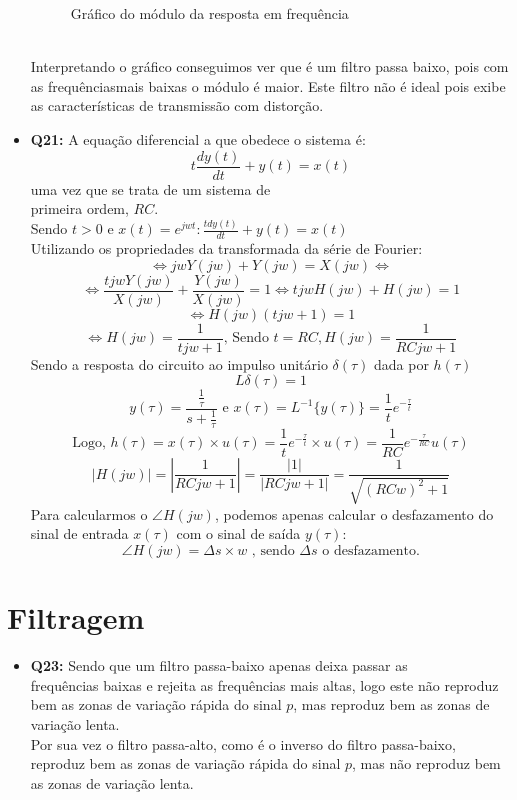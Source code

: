 \documentclass[a4paper, 12pt]{article}
\begin{document}
\begin{itemize}
\begin{figure}[!ht]
              \vspace{-10px}
              \caption{Gráfico do módulo da resposta em frequência}
          \end{figure}
          \\Interpretando o gráfico conseguimos ver que é um filtro passa baixo, pois com as frequênciasmais baixas o módulo é maior. Este filtro não é ideal pois exibe as características de transmissão com distorção.
    \item \textbf{Q21:} A equação diferencial a que obedece o sistema é:
          \[t\frac{dy(t)}{dt} + y(t) = x(t)\]
          uma vez que se trata de um sistema de\\
          primeira ordem, $RC$.\\
          Sendo $t>0$ e $x(t) = e^{jwt}: \frac{tdy(t)}{dt} + y(t) = x(t)$\\
          Utilizando os propriedades da transformada da série de Fourier:
          \[\Leftrightarrow jwY(jw) + Y(jw) = X(jw)\Leftrightarrow\]
          \[\Leftrightarrow \frac{tjwY(jw)}{X(jw)} + \frac{Y(jw)}{X(jw)} = 1 \Leftrightarrow tjwH(jw) + H(jw) = 1\]
          \[\Leftrightarrow H(jw)(tjw + 1) = 1\]
          \[\Leftrightarrow H(jw) = \frac{1}{tjw + 1} \textrm{, Sendo } t = RC, H(jw) = \frac{1}{RCjw + 1}\]
          Sendo a resposta do circuito ao impulso unitário $\delta(\tau)$ dada por $h(\tau)$
          \[L\delta(\tau) = 1\]
          \[y(\tau) = \frac{\frac{1}{\tau}}{s + \frac{1}{\tau}} \textrm{ e } x(\tau) = L^{-1}\{y(\tau)\} = \frac{1}{t}e^{-\frac{\tau}{t}}\]
          \[\textrm{Logo, } h(\tau) = x(\tau)\times u(\tau) = \frac{1}{t}e^{-\frac{\tau}{t}} \times u(\tau) = \frac{1}{RC}e^{-\frac{\tau}{RC}}u(\tau)\]
          \[ |H(jw)| = |\frac{1}{RCjw + 1}| = \frac{|1|}{|RCjw +1|} = \frac{1}{\sqrt{{(RCw)}^{2} + 1}}\]
          Para calcularmos o $\angle H(jw)$, podemos apenas calcular o desfazamento do sinal de entrada $x(\tau)$ com o sinal de saída $y(\tau)$:
          \[\angle H(jw) = \Delta s \times w \textrm{ , sendo } \Delta s \textrm{ o desfazamento.}\]
\end{itemize}
\newpage
\section{Filtragem}
\begin{itemize}
    \item \textbf{Q23:} Sendo que um filtro passa-baixo apenas deixa passar as\\
          frequências baixas e rejeita as frequências mais altas, logo este não reproduz bem as zonas de variação rápida do sinal $p$, mas reproduz bem as zonas de variação lenta.\\
          Por sua vez o filtro passa-alto, como é o inverso do filtro passa-baixo, reproduz bem as zonas de variação rápida do sinal $p$, mas não reproduz bem as zonas de variação lenta.
\end{itemize}
\newpage
\end{document}

